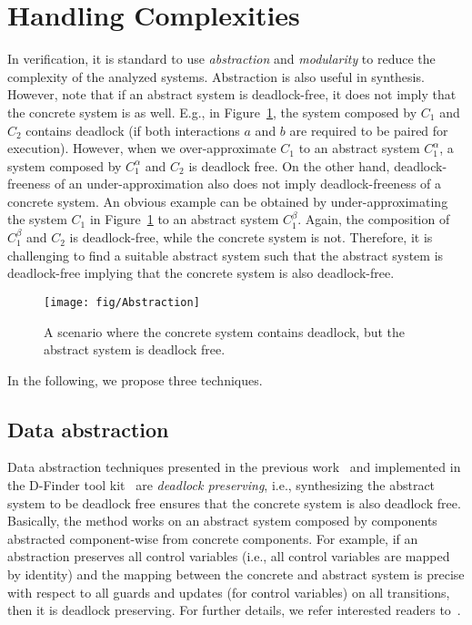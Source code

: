 \documentclass[10pt, a4paper, onecolumn, conference, compsocconf]{IEEEtran}
\begin{document}
\section{Handling Complexities\label{sec.algo.prioritysyn.complexities}}


In verification, it is standard to use \emph{abstraction} and \emph{modularity} to reduce the complexity of the analyzed systems.
Abstraction is also useful in synthesis.
However, note that if an abstract system is deadlock-free, it does not imply that the concrete system is as well.
E.g., in Figure~\ref{fig:vissbip.abstraction}, the system composed by $C_1$ and $C_2$ contains deadlock (if both interactions $a$ and $b$ are required to be paired for execution). However, when we over-approximate $C_1$ to an abstract system $C_1^{\alpha}$, a system composed by $C_1^{\alpha}$ and $C_2$ is deadlock free. On the other hand, deadlock-freeness of an under-approximation also does not imply deadlock-freeness of a concrete system. An obvious example can be obtained by under-approximating the system $C_1$ in Figure~\ref{fig:vissbip.abstraction} to an abstract system $C_1^{\beta}$. Again, the composition of $C_1^{\beta}$ and $C_2$ is deadlock-free, while the concrete system is not.
Therefore, it is challenging to find a suitable abstract system such that the abstract system is deadlock-free implying that the concrete system is also deadlock-free.
\begin{figure}[h]
\centering
 \texttt{[image: fig/Abstraction]}
  \caption{A scenario where the concrete system contains deadlock, but the abstract system is deadlock free.}
 \label{fig:vissbip.abstraction}
\end{figure}


In the following, we propose three techniques.

\subsection{Data abstraction\label{subsec.algo.prioritysyn.dp.abstraction}}

Data abstraction techniques presented in the previous work~\cite{bensalem2008compositional} and implemented in the D-Finder tool kit~\cite{bensalem:dfinder2:2011} are \emph{deadlock preserving}, i.e., synthesizing the abstract system to be deadlock free ensures that the concrete system is also deadlock free. Basically, the method works on an abstract system composed by components abstracted component-wise from concrete components. For example, if an abstraction preserves all control variables (i.e., all control variables are mapped by identity) and the mapping between the concrete and abstract system is precise with respect to all guards and updates (for control variables) on all transitions, then it is deadlock preserving. For further details, we refer interested readers to~\cite{bensalem2008compositional,bensalem:dfinder2:2011}.
\end{document}
